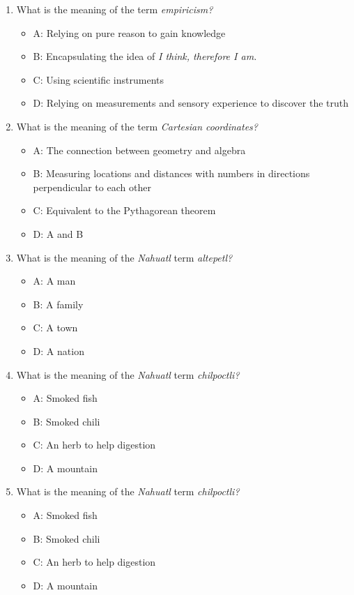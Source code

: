 \documentclass[10pt]{article}
\begin{document}
\begin{enumerate}
\item What is the meaning of the term \textit{empiricism?}
\begin{itemize}
\item A: Relying on pure reason to gain knowledge
\item B: Encapsulating the idea of \textit{I think, therefore I am.}
\item C: Using scientific instruments
\item D: Relying on measurements and sensory experience to discover the truth
\end{itemize}
\item What is the meaning of the term \textit{Cartesian coordinates?}
\begin{itemize}
\item A: The connection between geometry and algebra
\item B: Measuring locations and distances with numbers in directions perpendicular to each other
\item C: Equivalent to the Pythagorean theorem
\item D: A and B
\end{itemize}
\item What is the meaning of the \textit{Nahuatl} term \textit{altepetl?}
\begin{itemize}
\item A: A man
\item B: A family
\item C: A town
\item D: A nation
\end{itemize}
\item What is the meaning of the \textit{Nahuatl} term \textit{chilpoctli?}
\begin{itemize}
\item A: Smoked fish
\item B: Smoked chili
\item C: An herb to help digestion
\item D: A mountain
\end{itemize}
\item What is the meaning of the \textit{Nahuatl} term \textit{chilpoctli?}
\begin{itemize}
\item A: Smoked fish
\item B: Smoked chili
\item C: An herb to help digestion
\item D: A mountain

\end{itemize}
\end{enumerate}
\end{document}
